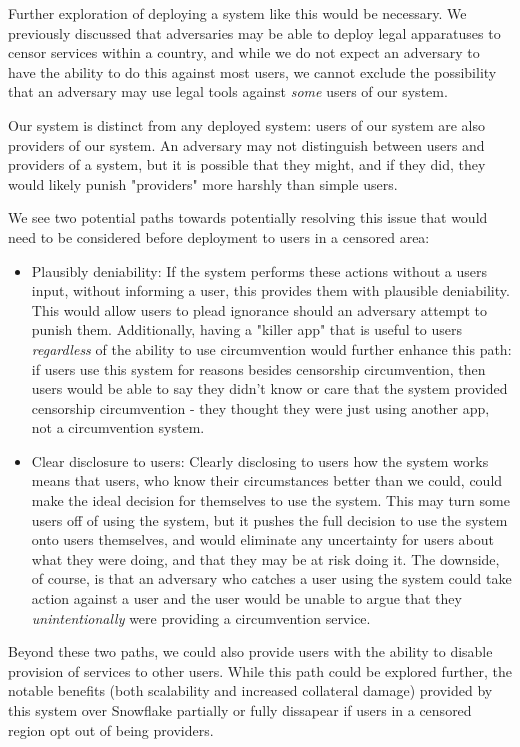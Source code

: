 \documentclass[12pt]{report}
\begin{document}
Further exploration of deploying a system like this would be necessary. We previously discussed that adversaries may be able to deploy legal apparatuses to censor services within a country, and while we do not expect an adversary to have the ability to do this against most users, we cannot exclude the possibility that an adversary may use legal tools against \emph{some} users of our system.

Our system is distinct from any deployed system: users of our system are also providers of our system. An adversary may not distinguish between users and providers of a system, but it is possible that they might, and if they did, they would likely punish "providers" more harshly than simple users.

We see two potential paths towards potentially resolving this issue that would need to be considered before deployment to users in a censored area:
\begin{itemize}
  \item Plausibly deniability: If the system performs these actions without a users input, without informing a user, this provides them with plausible deniability. This would allow users to plead ignorance should an adversary attempt to punish them. Additionally, having a "killer app" that is useful to users \emph{regardless} of the ability to use circumvention would further enhance this path: if users use this system for reasons besides censorship circumvention, then users would be able to say they didn't know or care that the system provided censorship circumvention - they thought they were just using another app, not a circumvention system. 
  \item Clear disclosure to users: Clearly disclosing to users how the system works means that users, who know their circumstances better than we could, could make the ideal decision for themselves to use the system. This may turn some users off of using the system, but it pushes the full decision to use the system onto users themselves, and would eliminate any uncertainty for users about what they were doing, and that they may be at risk doing it. The downside, of course, is that an adversary who catches a user using the system could take action against a user and the user would be unable to argue that they \emph{unintentionally} were providing a circumvention service.
\end{itemize}

Beyond these two paths, we could also provide users with the ability to disable provision of services to other users. While this path could be explored further, the notable benefits (both scalability and increased collateral damage) provided by this system over Snowflake partially or fully dissapear if users in a censored region opt out of being providers.
\end{document}
